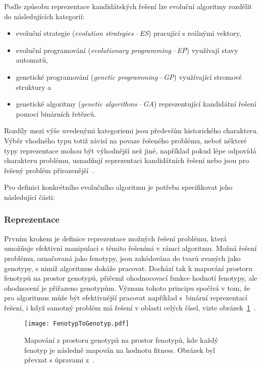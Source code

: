 Podle způsobu reprezentace kandidátských řešení lze evoluční algoritmy rozdělit do následujících kategorií:
\begin{itemize}
    \item evoluční strategie (\emph{evolution strategies\,--\,ES}) pracující s reálnými vektory,
    \item evoluční programování (\emph{evolutionary programming\,--\,EP}) využívají stavy automatů,
    \item genetické programování (\emph{genetic programming\,--\,GP}) využívající stromové struktury a
    \item genetické algoritmy (\emph{genetic algorithms\,--\,GA}) reprezentující kandidátní řešení pomocí binárních řetězců. 
\end{itemize}
Rozdíly mezi výše uvedenými kategoriemi jsou především historického charakteru. 
Výběr vhodného typu totiž závisí na povaze řešeného problému, neboť některé typy reprezentace mohou být výhodnější než jiné, například pokud lépe odpovídá charakteru problému, usnadňují reprezentaci kandidátních řešení nebo jsou pro řešený problém přirozenější~\cite{IntroductionToEvoComputing}. 

Pro definici konkrétního evolučního algoritmu je potřeba specifikovat jeho následující části:

\subsubsection*{Reprezentace}
Prvním krokem je definice reprezentace možných řešení problému, která umožňuje efektivní manipulaci s těmito řešeními v rámci algoritmu. 
Možná řešení problému, označovaná jako fenotypy, jsou zakódována do tvarů zvaných jako genotypy, s nimiž algoritmus dokáže pracovat. 
Dochází tak k mapování prostoru fenotypů na prostor genotypů, přičemž ohodnocovací funkce hodnotí fenotypy, ale ohodnocení je přiřazeno genotypům. 
Význam tohoto principu spočívá v tom, že pro algoritmus může být efektivnější pracovat například s~binární reprezentací řešení, i když samotný problém má řešení v oblasti celých čísel, vizte obrázek~\ref{fig:fenotyp-to-genotyp}~\cite{IntroductionToEvoComputing,NaturalComputing}. 
\begin{figure}[ht!]
    \centering
    \texttt{[image: FenotypToGenotyp.pdf]}
    \caption{Mapování z prostoru genotypů na prostor fenotypů, kde každý fenotyp je následně mapován na hodnotu fitness. Obrázek byl převzat s úpravami z~\cite{NaturalComputing}.}
    \label{fig:fenotyp-to-genotyp}
\end{figure}

